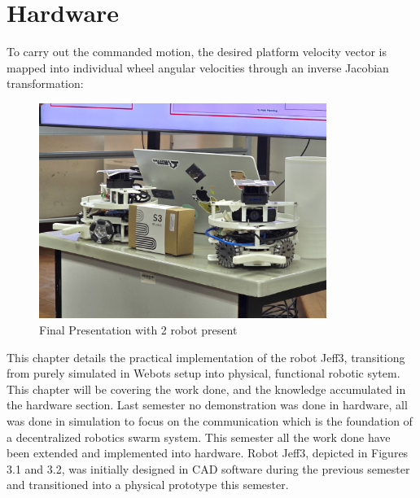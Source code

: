 \chapter{Hardware}
To carry out the commanded motion, the desired platform velocity vector is mapped into individual wheel angular velocities through an inverse Jacobian transformation:
\begin{figure} [H]
    \centering
    \includegraphics[height=7cm]{assets/images/hardware/irl-2-robots.jpeg}
    \caption{Final Presentation with 2 robot present}
    \label{fig:2-robot-present}
\end{figure}
This chapter details the practical implementation of the robot Jeff3, transitiong from purely simulated in Webots setup into physical, functional robotic sytem.
This chapter will be covering the work done, and the knowledge accumulated in the hardware section. Last semester no demonstration was done in hardware, all was done in simulation to focus on the communication which is the foundation of a decentralized robotics swarm system. This semester all the work done have been extended and implemented into hardware. Robot Jeff3, depicted in Figures 3.1 and 3.2, was initially designed in CAD software during the previous semester and transitioned into a physical prototype this semester.

